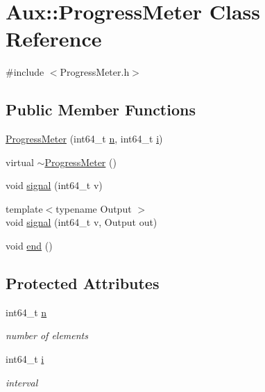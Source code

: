 \hypertarget{class_aux_1_1_progress_meter}{\section{Aux\-:\-:Progress\-Meter Class Reference}
\label{class_aux_1_1_progress_meter}
}


{\ttfamily \#include $<$Progress\-Meter.\-h$>$}

\subsection*{Public Member Functions}
\begin{DoxyCompactItemize}
\item 
\hyperlink{class_aux_1_1_progress_meter_a9aa93bf3d012d7e0aaf160705f5200ac}{Progress\-Meter} (int64\-\_\-t \hyperlink{class_aux_1_1_progress_meter_aff17aa3d8448d8bcc181ba9c5752a994}{n}, int64\-\_\-t \hyperlink{class_aux_1_1_progress_meter_a9010eced162c940f8e790efa6b7b7951}{i})
\item 
virtual \hyperlink{class_aux_1_1_progress_meter_a66c6a92905b1d0080173fd8d43066857}{$\sim$\-Progress\-Meter} ()
\item 
void \hyperlink{class_aux_1_1_progress_meter_ac850b5a02da40912ca5f87a8c7bff5b3}{signal} (int64\-\_\-t v)
\item 
{\footnotesize template$<$typename Output $>$ }\\void \hyperlink{class_aux_1_1_progress_meter_a3871dc92cf3b964eb9255f8ead508a35}{signal} (int64\-\_\-t v, Output out)
\item 
void \hyperlink{class_aux_1_1_progress_meter_a4447a41339a5b19480fe4d32d360a393}{end} ()
\end{DoxyCompactItemize}
\subsection*{Protected Attributes}
\begin{DoxyCompactItemize}
\item 
int64\-\_\-t \hyperlink{class_aux_1_1_progress_meter_aff17aa3d8448d8bcc181ba9c5752a994}{n}
\begin{DoxyCompactList}\small\item\em number of elements \end{DoxyCompactList}\item 
int64\-\_\-t \hyperlink{class_aux_1_1_progress_meter_a9010eced162c940f8e790efa6b7b7951}{i}
\begin{DoxyCompactList}\small\item\em interval \end{DoxyCompactList}\end{DoxyCompactItemize}


